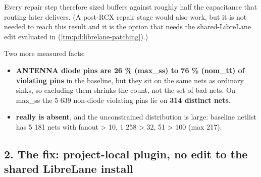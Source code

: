 \begin{record}
Every repair step therefore sized buffers against roughly half the
capacitance that routing later delivers. (A post-RCX repair stage would
also work, but it is not needed to reach this result and it is the
option that needs the shared-LibreLane edit evaluated in
 (\cref{tm:pd:librelane-patching}).)

Two more measured facts:

\begin{itemize}
\tightlist
\item
  \textbf{ANTENNA diode pins are 26 \% (max\_ss) to 76 \% (nom\_tt) of
  violating pins} in the baseline, but they sit on the same nets as
  ordinary sinks, so excluding them shrinks the count, not the set of
  bad nets. On max\_ss the 5 639 non-diode violating pins lie on
  \textbf{314 distinct nets}.
\item
  \textbf{ really is absent}, and the unconstrained
  distribution is large: baseline netlist has 5 181 nets with fanout
  \textgreater{} 10, 1 258 \textgreater{} 32, 51 \textgreater{} 100 (max
  217).
\end{itemize}

\end{record}

\subsection{2. The fix: project-local plugin, no edit to the shared
LibreLane install}\label{cr:defect:sky130-slew-cap-e45j:2-the-fix-project-local-plugin-no-edit-to-the-shared-librelane-install}

